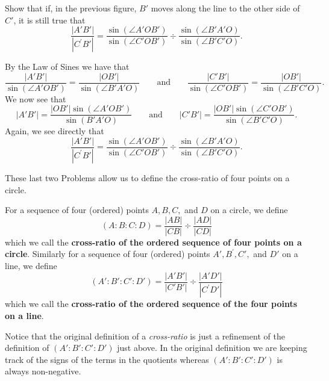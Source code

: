 \documentclass{ximera}
\begin{document}
\begin{problem}\label{49}
Show that if, in the previous figure, $B'$ moves
along the line to the other side of $C'$, it is still true that%
\[
\frac{\left\vert A'B'\right\vert }{\left\vert C^{\prime
}B'\right\vert }=\frac{\sin\left(  \angle A'%
OB'\right)  }{\sin\left(  \angle C'OB'\right)
}\div\frac{\sin\left(  \angle B'A'O\right)
}{\sin\left(  \angle B'C'O\right)  }.
\]
\begin{freeResponse}
By the Law of Sines we have that
\[
\frac{|A'B'|}{\sin(\angle A'OB')} = \frac{|OB'|}{\sin(\angle B'A'O)}\qquad\text{and}\qquad\frac{|C'B'|}{\sin(\angle C'OB')} = \frac{|OB'|}{\sin(\angle B'C'O)}.
\]
We now see that
\[
|A'B'| = \frac{|OB'|\sin(\angle A'OB')}{\sin(B'A'O)}\qquad\text{and}\qquad|C'B'| = \frac{|OB'|\sin(\angle C'OB')}{\sin(\angle B'C'O)}.
\]
Again, we see directly that 
\[
\frac{\left\vert A'B'\right\vert }{\left\vert C^{\prime
}B'\right\vert }=\frac{\sin\left(  \angle A'%
OB'\right)  }{\sin\left(  \angle C'OB'\right)
}\div\frac{\sin\left(  \angle B'A'O\right)
}{\sin\left(  \angle B'C'O\right)  }.
\]
\end{freeResponse}
\end{problem}

These last two Problems allow us to define the cross-ratio of four
points on a circle.

\begin{definition}
For a sequence of four (ordered) points $A,B,C,$ and $D$ on a circle,
we define%
\[
\left(  A:B:C:D\right)  =\frac{\left\vert AB\right\vert }{\left\vert
CB\right\vert }\div\frac{\left\vert AD\right\vert }{\left\vert CD\right\vert }%
\]
which we call the \textbf{cross-ratio of the ordered sequence of four
  points on a circle}.  Similarly for a sequence of four (ordered) points
$A',B^{\prime },C',$ and $D'$ on a line, we define%
\[
\left(  A':B':C':D'\right)  =\frac{\left\vert
A'B'\right\vert }{\left\vert C'B'\right\vert
}\div\frac{\left\vert A'D'\right\vert }{\left\vert C^{\prime
}D'\right\vert }%
\]
which we call the \textbf{cross-ratio of the ordered sequence of the
  four points on a line}.
\end{definition}

Notice that the original definition of a \textit{cross-ratio} is just
a refinement of the definition of $\left( A':B':C':D'\right)$ just
above. In the original definition we are keeping track of the signs of
the terms in the quotients whereas $\left( A':B':C':D'\right)$ is
always non-negative.
\end{document}
